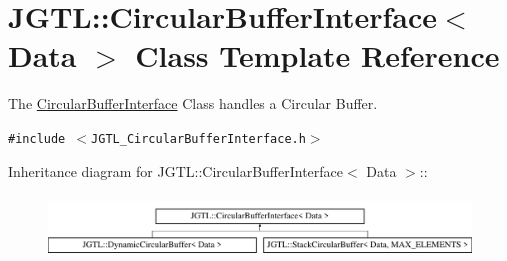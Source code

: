 \hypertarget{class_j_g_t_l_1_1_circular_buffer_interface}{
\section{JGTL::Circular\-Buffer\-Interface$<$ Data $>$ Class Template Reference}
\label{class_j_g_t_l_1_1_circular_buffer_interface}
}
The \hyperlink{class_j_g_t_l_1_1_circular_buffer_interface}{Circular\-Buffer\-Interface} Class handles a Circular Buffer.  


{\tt \#include $<$JGTL\_\-Circular\-Buffer\-Interface.h$>$}

Inheritance diagram for JGTL::Circular\-Buffer\-Interface$<$ Data $>$::\begin{figure}[H]
\begin{center}
\leavevmode
\includegraphics[height=1.70213cm]{class_j_g_t_l_1_1_circular_buffer_interface}
\end{center}
\end{figure}
